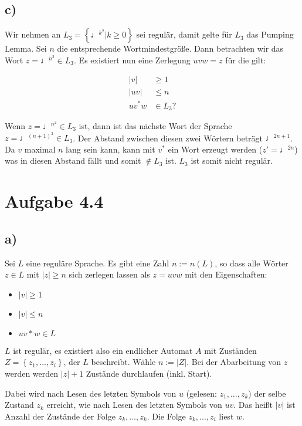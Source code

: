 \documentclass{article}
\begin{document}
\subsection*{c)}
Wir nehmen an $L_3=\left\{\quarternote^{k^2}| k\geq0 \right\}$ sei regulär, damit gelte für $L_3$ das Pumping Lemma. Sei $n$ die entsprechende Wortmindestgröße. Dann betrachten wir das Wort $z=\quarternote^{n^2} \in L_3$. Es existiert nun eine Zerlegung $uvw=z$ für die gilt:

\begin{align}
|v| &\geq 1\\
|uv| &\leq n\\
uv^*w &\in L_3 ?
\end{align}

Wenn $z=\quarternote^{n^2} \in L_3$ ist, dann ist das nächste Wort der Sprache $z=\quarternote^{(n+1)^2} \in L_3$. Der Abstand zwischen diesen zwei Wörtern beträgt $\quarternote^{2n+1}$. Da $v$ maximal $n$ lang sein kann, kann mit $v^*$ ein Wort erzeugt werden ($z'=\quarternote^{2n}$) was in diesen Abstand fällt und somit $\notin L_3$ ist. $L_3$ ist somit nicht regulär.



\section*{Aufgabe 4.4}
\subsection*{a)}
Sei $L$ eine reguläre Sprache. Es gibt eine Zahl $n := n(L)$, so dass alle Wörter $z \in L$ mit $|z| \geq n$ sich zerlegen lassen als $z = uvw$ mit den Eigenschaften:
\begin{itemize}
	\item $|v| \geq 1$
	\item $|v| \leq n$
	\item $uv*w \in L$
\end{itemize}

$L$ ist regulär, es existiert also ein endlicher Automat $A$ mit Zuständen \linebreak$Z = \left\{z_1, ..., z_i\right\}$, der $L$ beschreibt. Wähle $n := |Z|$. Bei der Abarbeitung von $z$ werden werden $|z|+1$ Zustände durchlaufen (inkl. Start).

Dabei wird nach Lesen des letzten Symbols von $u$ (gelesen: $z_1,...,z_k$) der selbe Zustand $z_k$ erreicht, wie nach Lesen des letzten Symbols von $uv$. Das heißt $|v|$ ist Anzahl der Zustände der Folge $z_k, ...,z_k$. Die Folge $z_k,...,z_i$ liest $w$.
\end{document}
